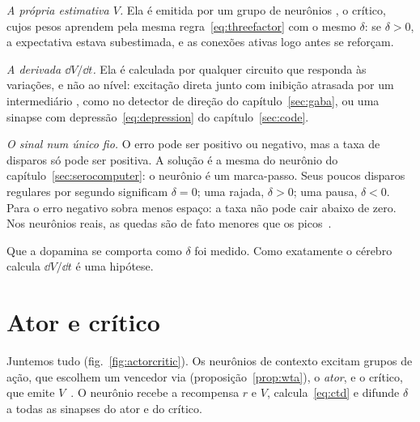 \emph{A própria estimativa $V$.} Ela é emitida por um grupo de neurônios , o crítico, cujos pesos aprendem pela mesma regra~\eqref{eq:threefactor} com o mesmo $\delta$: se $\delta>0$, a expectativa estava subestimada, e as conexões ativas logo antes se reforçam.

\emph{A derivada $\dd V/\dd t$.} Ela é calculada por qualquer circuito que responda às variações, e não ao nível: excitação direta junto com inibição atrasada por um intermediário , como no detector de direção do capítulo~\ref{sec:gaba}, ou uma sinapse com depressão~\eqref{eq:depression} do capítulo~\ref{sec:code}.

\emph{O sinal num único fio.} O erro pode ser positivo ou negativo, mas a taxa de disparos só pode ser positiva. A solução é a mesma do neurônio  do capítulo~\ref{sec:serocomputer}: o neurônio  é um marca-passo. Seus poucos disparos regulares por segundo significam $\delta=0$; uma rajada, $\delta>0$; uma pausa, $\delta<0$. Para o erro negativo sobra menos espaço: a taxa não pode cair abaixo de zero. Nos neurônios  reais, as quedas são de fato menores que os picos~\cite{Bayer2005}.

Que a dopamina se comporta como $\delta$ foi medido. Como exatamente o cérebro calcula $\dd V/\dd t$ é uma hipótese.

\section{Ator e crítico}

Juntemos tudo (fig.~\ref{fig:actorcritic}). Os neurônios de contexto excitam grupos de ação, que escolhem um vencedor via  (proposição~\ref{prop:wta}), o \emph{ator}, e o crítico, que emite $V$~\cite{SuttonBarto2018}. O neurônio  recebe a recompensa $r$ e $V$, calcula~\eqref{eq:ctd} e difunde $\delta$ a todas as sinapses do ator e do crítico.


